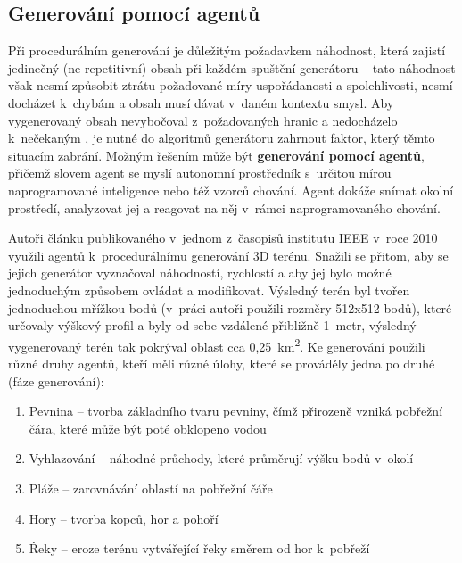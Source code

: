 
\subsection{Generování pomocí agentů}


Při procedurálním generování je důležitým požadavkem náhodnost, která zajistí jedinečný (ne repetitivní) obsah při každém spuštění generátoru -- tato náhodnost však nesmí způsobit ztrátu požadované míry uspořádanosti a spolehlivosti, nesmí docházet k~chybám a obsah musí dávat v~daném kontextu smysl.
Aby vygenerovaný obsah nevybočoval z~požadovaných hranic a nedocházelo k~nečekaným , je nutné do algoritmů generátoru zahrnout faktor, který těmto situacím zabrání.
Možným řešením může být \textbf{generování pomocí agentů}, přičemž slovem agent se myslí autonomní prostředník s~určitou mírou naprogramované inteligence nebo též vzorců chování.
Agent dokáže snímat okolní prostředí, analyzovat jej a reagovat na něj v~rámci naprogramovaného chování.
\par
Autoři článku\cite{lit:agent_terrain} publikovaného v~jednom z~časopisů institutu IEEE v~roce 2010 využili agentů k~procedurálnímu generování 3D terénu.
Snažili se přitom, aby se jejich generátor vyznačoval náhodností, rychlostí a aby jej bylo možné jednoduchým způsobem ovládat a modifikovat.
Výsledný terén byl tvořen jednoduchou mřížkou bodů (v~práci autoři použili rozměry 512x512 bodů), které určovaly výškový profil a byly od sebe vzdálené přibližně 1~metr, výsledný vygenerovaný terén tak pokrýval oblast cca 0,25~km\textsuperscript{2}.
Ke generování použili různé druhy agentů, kteří měli různé úlohy, které se prováděly jedna po druhé (fáze generování):
\begin{enumerate}
    \item Pevnina -- tvorba základního tvaru pevniny, čímž přirozeně vzniká pobřežní čára, které může být poté obklopeno vodou
    \item Vyhlazování -- náhodné průchody, které průměrují výšku bodů v~okolí
    \item Pláže -- zarovnávání oblastí na pobřežní čáře
    \item Hory -- tvorba kopců, hor a pohoří
    \item Řeky -- eroze terénu vytvářející řeky směrem od hor k~pobřeží
\end{enumerate}
